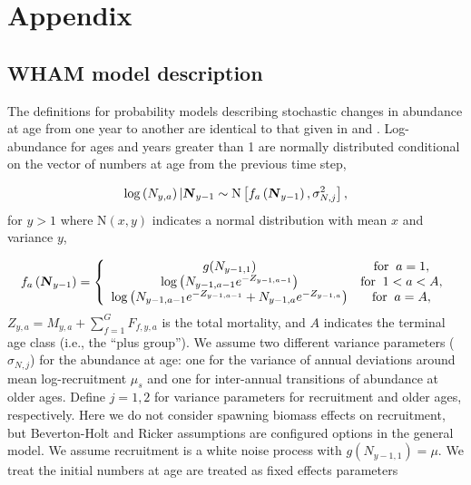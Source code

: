 \documentclass[12pt,letterpaper, leqno]{article}
\begin{document}


\clearpage

\section*{Appendix}

\subsection*{WHAM model description}

The definitions for probability models describing stochastic changes in abundance at age from one year to another are identical to that given in \citet{milleretal16} and \citet{millerhyun18}. Log-abundance for ages and years greater than 1 are normally distributed conditional on the vector of numbers at age from the previous
time step,

\vspace{-12pt}
\begin{equation*}
\log\left( N_{y,a}\right) | \textbf{\textsl{N}}_{y-1} \sim \text{N}\left[f_a\left(\textbf{\textsl{N}}_{y-1}\right), \sigma_{N,j}^2\right],
\end{equation*}
for $y>1$ where $\text{N}(x,y)$ indicates a normal distribution with mean $x$ and variance $y$,

\vspace{-12pt}
\begin{equation*}
 f_a\left(\textbf{\textsl{N}}_{y-1}\right) = \left\{ 
 \begin{array}{cc}
   g(N_{y-1,1}) & \text{for}\;\;a = 1,\\
   \log\left(N_{y-1,a-1}e^{-Z_{y-1,a-1}}\right) & \text{for}\;\;1<a<A,\\
   \log\left(N_{y-1,a-1}e^{-Z_{y-1,a-1}} + N_{y-1,a}e^{-Z_{y-1,a}}\right) & \text{for}\;\;a = A,
 \end{array}\right.
\end{equation*}
$Z_{y,a} = M_{y,a}+ \sum^G_{f=1} F_{f,y,a}$ is the total mortality, and $A$ indicates the terminal age class (i.e., the ``plus group''). We assume two different variance parameters ($\sigma_{N,j}$) for the abundance at age: one for the variance of annual deviations around mean log-recruitment $\mu_s$ and one for inter-annual transitions of abundance at older ages. Define $j = 1,2$ for variance parameters for recruitment and older ages, respectively. Here we do not consider spawning biomass effects on recruitment, but Beverton-Holt and Ricker assumptions are configured options in the general model. We assume recruitment is a white noise process with $g(N_{y-1,1}) = \mu$. We treat the initial numbers at age are treated as fixed effects parameters
\end{document}
